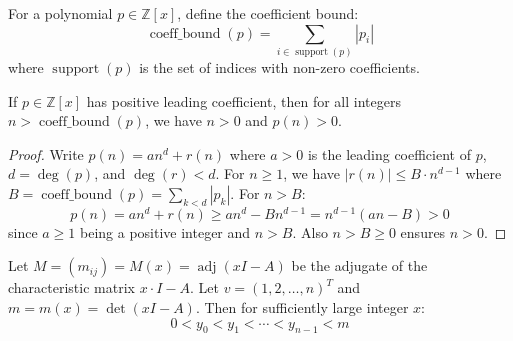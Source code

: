 \begin{definition}
\label{def:coeff_bound}
\leanok
For a polynomial $p \in \mathbb{Z}[x]$, define the coefficient bound:
$$\operatorname{coeff\_bound}(p) = \sum_{i \in \operatorname{support}(p)} |p_i|$$
where $\operatorname{support}(p)$ is the set of indices with non-zero coefficients.
\end{definition}

\begin{lemma}
\label{lem:polynomial_positive}
\leanok
If $p \in \mathbb{Z}[x]$ has positive leading coefficient, then for all integers $n > \operatorname{coeff\_bound}(p)$, we have $n > 0$ and $p(n) > 0$.
\end{lemma}

\begin{proof}
\leanok
Write $p(n) = an^d + r(n)$ where $a > 0$ is the leading coefficient of $p$, $d = \deg(p)$, and $\deg(r) < d$.
For $n \geq 1$, we have $|r(n)| \leq B \cdot n^{d-1}$ where $B = \operatorname{coeff\_bound}(p) = \sum_{k < d} |p_k|$.
For $n > B$:
$$p(n) = an^d + r(n) \geq an^d - Bn^{d-1} = n^{d-1}(an - B) > 0$$
since $a \geq 1$ being a positive integer and $n > B$. Also $n > B \geq 0$ ensures $n > 0$.
\end{proof}

\begin{lemma}
\label{lem:adj_poly_strict_increasing}
\leanok
{}
Let $M = (m_{ij}) = M(x) = \operatorname{adj}(x I - A)$ be the adjugate of the characteristic matrix $x\cdot I - A$.
Let $v = (1,2,\ldots,n)^T$ and $m = m(x) = \det(x I - A)$. Then for sufficiently large integer $x$:
$$0 < y_0 < y_1 < \cdots < y_{n-1} < m$$
\end{lemma}

